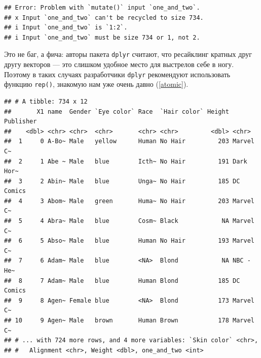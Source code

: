 \documentclass[]{book}
\newenvironment{Shaded}{\begin{snugshade}}{\end{snugshade}}
\newcommand{\KeywordTok}[1]{\textcolor[rgb]{0.13,0.29,0.53}{\textbf{#1}}}
\newcommand{\DataTypeTok}[1]{\textcolor[rgb]{0.13,0.29,0.53}{#1}}
\newcommand{\DecValTok}[1]{\textcolor[rgb]{0.00,0.00,0.81}{#1}}
\newcommand{\StringTok}[1]{\textcolor[rgb]{0.31,0.60,0.02}{#1}}
\newcommand{\OperatorTok}[1]{\textcolor[rgb]{0.81,0.36,0.00}{\textbf{#1}}}
\newcommand{\NormalTok}[1]{#1}
\begin{document}
\begin{Shaded}
\end{Shaded}

\begin{verbatim}
## Error: Problem with `mutate()` input `one_and_two`.
## x Input `one_and_two` can't be recycled to size 734.
## i Input `one_and_two` is `1:2`.
## i Input `one_and_two` must be size 734 or 1, not 2.
\end{verbatim}

Это не баг, а фича: авторы пакета \texttt{dplyr} считают, что ресайклинг
кратных друг другу векторов --- это слишком удобное место для выстрелов
себе в ногу. Поэтому в таких случаях разработчики \texttt{dplyr}
рекомендуют использовать функцию \texttt{rep()}, знакомую нам уже очень
давно (\ref{atomic}).

\begin{Shaded}
\end{Shaded}

\begin{verbatim}
## # A tibble: 734 x 12
##       X1 name  Gender `Eye color` Race  `Hair color` Height Publisher
##    <dbl> <chr> <chr>  <chr>       <chr> <chr>         <dbl> <chr>    
##  1     0 A-Bo~ Male   yellow      Human No Hair         203 Marvel C~
##  2     1 Abe ~ Male   blue        Icth~ No Hair         191 Dark Hor~
##  3     2 Abin~ Male   blue        Unga~ No Hair         185 DC Comics
##  4     3 Abom~ Male   green       Huma~ No Hair         203 Marvel C~
##  5     4 Abra~ Male   blue        Cosm~ Black            NA Marvel C~
##  6     5 Abso~ Male   blue        Human No Hair         193 Marvel C~
##  7     6 Adam~ Male   blue        <NA>  Blond            NA NBC - He~
##  8     7 Adam~ Male   blue        Human Blond           185 DC Comics
##  9     8 Agen~ Female blue        <NA>  Blond           173 Marvel C~
## 10     9 Agen~ Male   brown       Human Brown           178 Marvel C~
## # ... with 724 more rows, and 4 more variables: `Skin color` <chr>,
## #   Alignment <chr>, Weight <dbl>, one_and_two <int>
\end{verbatim}
\end{document}
